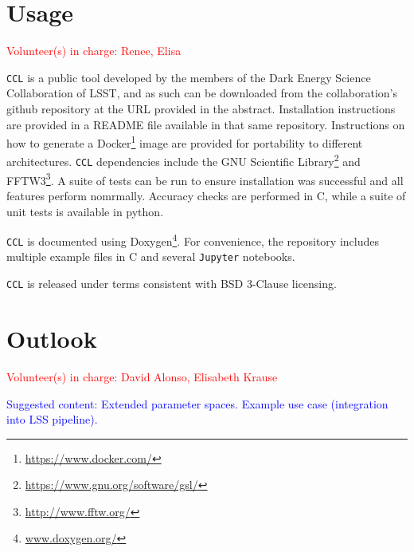 \documentclass[\docopts]{\docclass}
\newcommand{\vol}[1]{\textcolor{red}{Volunteer(s) in charge: #1}}
\newcommand{\cont}[1]{\textcolor{blue}{Suggested content: #1}}
\newcommand{\ccl}{{\tt CCL}\xspace}
\begin{document}
\section{Usage}
\vol{Renee, Elisa}

\ccl is a public tool developed by the members of the Dark Energy Science Collaboration of LSST, and as such can be downloaded from the collaboration's github repository at the URL provided in the abstract. Installation instructions are provided in a README file available in that same repository. Instructions on how to generate a Docker\footnote{\url{https://www.docker.com/}} image are provided for portability to different architectures. \ccl dependencies include the GNU Scientific Library\footnote{\url{https://www.gnu.org/software/gsl/}} and FFTW3\footnote{\url{http://www.fftw.org/}}. A suite of tests can be run to ensure installation was successful and all features perform nomrmally. Accuracy checks are performed in C, while a suite of unit tests is available in python.

\ccl is documented using Doxygen\footnote{\url{www.doxygen.org/}}. For convenience, the repository includes multiple example files in C and several {\tt Jupyter} notebooks. 

\ccl is released under terms consistent with BSD 3-Clause licensing. 

\section{Outlook}
\vol{David Alonso, Elisabeth Krause}

\cont{Extended parameter spaces. Example use case (integration into LSS pipeline).}

\vskip 5pt



\vskip 5pt




\end{document}
